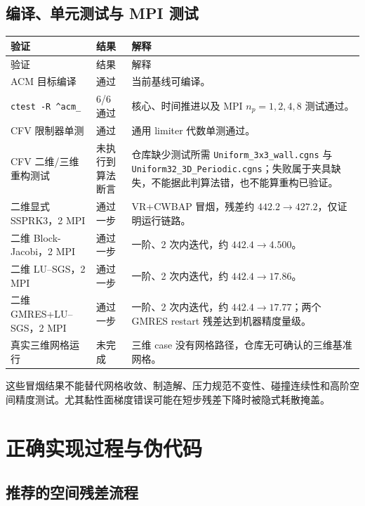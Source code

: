 \documentclass[UTF8,11pt,a4paper]{ctexart}
\newcommand{\code}[1]{\nolinkurl{#1}}
\begin{document}
\subsection{编译、单元测试与 MPI 测试}

\begin{longtable}{p{}p{}p{}}
\toprule
验证 & 结果 & 解释\\
\midrule
\endfirsthead
\toprule
验证 & 结果 & 解释\\
\midrule
\endhead
ACM 目标编译 & 通过 & 当前基线可编译。\\
\code{ctest -R ^acm_} & 6/6 通过 & 核心、时间推进以及 MPI $n_p=1,2,4,8$ 测试通过。\\
CFV 限制器单测 & 通过 & 通用 limiter 代数单测通过。\\
CFV 二维/三维重构测试 & 未执行到算法断言 & 仓库缺少测试所需 \code{Uniform_3x3_wall.cgns} 与 \code{Uniform32_3D_Periodic.cgns}；失败属于夹具缺失，不能据此判算法错，也不能算重构已验证。\\
二维显式 SSPRK3，2 MPI & 通过一步 & VR+CWBAP 冒烟，残差约 $442.2\to427.2$，仅证明运行链路。\\
二维 Block-Jacobi，2 MPI & 通过一步 & 一阶、2 次内迭代，约 $442.4\to4.500$。\\
二维 LU--SGS，2 MPI & 通过一步 & 一阶、2 次内迭代，约 $442.4\to17.86$。\\
二维 GMRES+LU--SGS，2 MPI & 通过一步 & 一阶、2 次内迭代，约 $442.4\to17.77$；两个 GMRES restart 残差达到机器精度量级。\\
真实三维网格运行 & 未完成 & 三维 case 没有网格路径，仓库无可确认的三维基准网格。\\
\bottomrule
\end{longtable}

这些冒烟结果不能替代网格收敛、制造解、压力规范不变性、碰撞连续性和高阶空间精度测试。尤其黏性面梯度错误可能在短步残差下降时被隐式耗散掩盖。

\section{正确实现过程与伪代码}

\subsection{推荐的空间残差流程}
\end{document}
